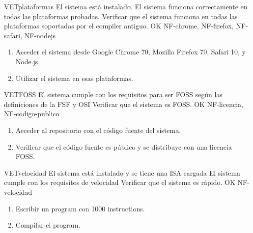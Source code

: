 \begin{testCase}{VET}{plataformas}
    {El sistema está instalado.} %
    {El sistema funciona correctamente en todas las plataformas probadas.} %
    {Verificar que el sistema funciona en todas las plataformas soportadas por
    el \gls{compiler} antiguo.} %
    {OK} %
    {NF-chrome, NF-firefox, NF-safari, NF-nodejs} %
    \begin{enumerate}[leftmargin=*, topsep=0pt, noitemsep] %
        \item Acceder el sistema desde Google Chrome 70, Mozilla Firefox 70,
        Safari 10, y Node.js.
        \item Utilizar el sistema en esas plataformas.
    \end{enumerate}
\end{testCase}

\begin{testCase}{VET}{FOSS}
    {\NA} %
    {El sistema cumple con los requisitos para ser \gls{FOSS} según las
    definiciones de la \gls{FSF} \parencite{FreeSoftware} y \gls{OSI}
    \parencite{OpenSource}} %
    {Verificar que el sistema es \gls{FOSS}.} %
    {OK} %
    {NF-licencia, NF-codigo-publico} %
    \begin{enumerate}[leftmargin=*, topsep=0pt, noitemsep] %
        \item Acceder al repositorio con el código fuente del sistema.
        \item Verificar que el código fuente es público y se distribuye con una licencia \gls{FOSS}.
    \end{enumerate}
\end{testCase}

\begin{testCase}{VET}{velocidad}
    {El sistema está instalado y se tiene una \gls{ISA} cargada} %
    {El sistema cumple con los requisitos de velocidad} %
    {Verificar que el sistema es rápido.} %
    {OK} %
    {NF-velocidad} %
    \begin{enumerate}[leftmargin=*, topsep=0pt, noitemsep] %
        \item Escribir un \gls{program} con 1000 \glspl{instruction}.
        \item Compilar el \gls{program}.
    \end{enumerate}
\end{testCase}

